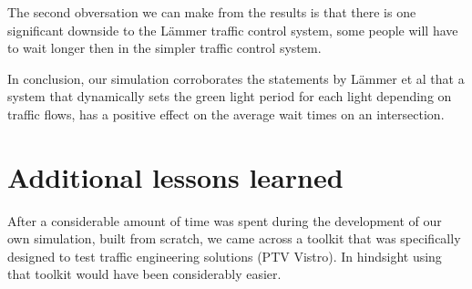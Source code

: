 \documentclass{article}
\begin{document}
The second obversation we can make from the results is that there is one significant downside to the L{\"a}mmer traffic control system, some people will have to wait longer then in the simpler traffic control system.

In conclusion, our simulation corroborates the statements by L{\"a}mmer et al that a system that dynamically sets the green light period for each light depending on traffic flows, has a positive effect on the average wait times on an intersection.


\section{Additional lessons learned}
After a considerable amount of time was spent during the development of our own simulation, built from scratch, we came across a toolkit that was specifically designed to test traffic engineering solutions (PTV Vistro). In hindsight using that toolkit would have been considerably easier.



\end{document}
